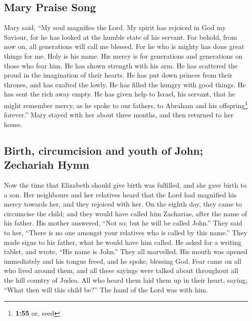 \hypertarget{mary-praise-song}{%
\subsection{Mary Praise Song}\label{mary-praise-song}}

 Mary said, ``My soul magnifies the Lord. 
My spirit has rejoiced in God my Saviour,  for he has
looked at the humble state of his servant. For behold, from now on, all
generations will call me blessed.  For he who is mighty
has done great things for me. Holy is his name.  His
mercy is for generations and generations on those who fear him.
 He has shown strength with his arm. He has scattered the
proud in the imagination of their hearts.  He has put
down princes from their thrones, and has exalted the lowly.
 He has filled the hungry with good things. He has sent
the rich away empty.  He has given help to Israel, his
servant, that he might remember mercy,  as he spoke to
our fathers, to Abraham and his offspring\footnote{\textbf{1:55} or,
  seed} forever.''  Mary stayed with her about three
months, and then returned to her house.

\hypertarget{birth-circumcision-and-youth-of-john-zechariah-hymn}{%
\subsection{Birth, circumcision and youth of John; Zechariah
Hymn}\label{birth-circumcision-and-youth-of-john-zechariah-hymn}}

 Now the time that Elizabeth should give birth was
fulfilled, and she gave birth to a son.  Her neighbours
and her relatives heard that the Lord had magnified his mercy towards
her, and they rejoiced with her.  On the eighth day, they
came to circumcise the child; and they would have called him Zacharias,
after the name of his father.  His mother answered, ``Not
so; but he will be called John.''  They said to her,
``There is no one amongst your relatives who is called by this name.''
 They made signs to his father, what he would have him
called.  He asked for a writing tablet, and wrote, ``His
name is John.'' They all marvelled.  His mouth was opened
immediately and his tongue freed, and he spoke, blessing God.
 Fear came on all who lived around them, and all these
sayings were talked about throughout all the hill country of Judea.
 All who heard them laid them up in their heart, saying,
``What then will this child be?'' The hand of the Lord was with him.

